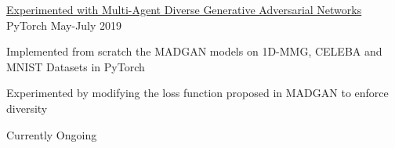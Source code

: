 

\begin{cventries}



  \projects
  {} %
  {\href{https://github.com/vinx-2105/MADGAN}{Experimented with Multi-Agent Diverse Generative Adversarial Networks}} %
  {PyTorch} %
  {May-July 2019} %
  {
    \begin{cvitems} %
      \item {Implemented from scratch the MADGAN models on 1D-MMG, CELEBA and MNIST Datasets in PyTorch}
      \item {Experimented by modifying the loss function proposed in MADGAN to enforce diversity}
      \item {Currently Ongoing}
    \end{cvitems}
  }


\end{cventries}

